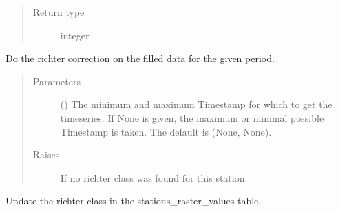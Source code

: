 \documentclass[letterpaper,10pt,english]{sphinxmanual}
\begin{document}
\begin{fulllineitems}
\begin{fulllineitems}
\begin{quote}
\begin{description}
\item[{Return type}] \leavevmode
\sphinxAtStartPar
integer

\end{description}\end{quote}

\end{fulllineitems}


\begin{fulllineitems}
\label{\detokenize{weatherDB:weatherDB.station.PrecipitationStation.richter_correct}}
\sphinxAtStartPar
Do the richter correction on the filled data for the given period.
\begin{quote}\begin{description}
\item[{Parameters}] \leavevmode
\sphinxAtStartPar
{} (\sphinxstyleliteralemphasis{\sphinxupquote{, }}) \textendash{} The minimum and maximum Timestamp for which to get the timeseries.
If None is given, the maximum or minimal possible Timestamp is taken.
The default is (None, None).

\item[{Raises}] \leavevmode
\sphinxAtStartPar
{} \textendash{} If no richter class was found for this station.

\end{description}\end{quote}

\end{fulllineitems}


\begin{fulllineitems}
\label{\detokenize{weatherDB:weatherDB.station.PrecipitationStation.update_richter_class}}
\sphinxAtStartPar
Update the richter class in the stations\_raster\_values table.


\end{fulllineitems}
\end{fulllineitems}
\end{document}
